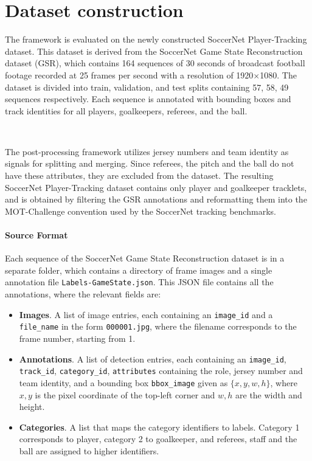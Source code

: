 \section{Dataset construction}\label{dataset_construction}
The framework is evaluated on the newly constructed SoccerNet Player-Tracking dataset. This dataset is derived from the SoccerNet Game State Reconstruction dataset (GSR), which contains 164 sequences of 30 seconds of broadcast football footage recorded at 25 frames per second with a resolution of 1920$\times$1080. The dataset is divided into train, validation, and test splits containing 57, 58, 49 sequences respectively. Each sequence is annotated with bounding boxes and track identities for all players, goalkeepers, referees, and the ball. 

\

The post-processing framework utilizes jersey numbers and team identity as signals for splitting and merging. Since referees, the pitch and the ball do not have these attributes, they are excluded from the dataset. The resulting SoccerNet Player-Tracking dataset contains only player and goalkeeper tracklets, and is obtained by filtering the GSR annotations and reformatting them into the MOT-Challenge convention used by the SoccerNet tracking benchmarks.

\paragraph{Source Format}
Each sequence of the SoccerNet Game State Reconstruction dataset is in a separate folder, which contains a directory of frame images and a single annotation file \texttt{Labels-GameState.json}. This JSON file contains all the annotations, where the relevant fields are:
\begin{itemize}
    \item \textbf{Images}. A list  of image entries, each containing an \texttt{image\_id} and a \texttt{file\_name} in the form \texttt{000001.jpg}, where the filename corresponds to the frame number, starting from 1.

    \item \textbf{Annotations}. A list of detection entries, each containing an \texttt{image\_id}, \texttt{track\_id}, \texttt{category\_id}, \texttt{attributes} containing the role, jersey number and team identity, and a bounding box \texttt{bbox\_image} given as $\{x,y,w,h\}$, where $x,y$ is the pixel coordinate of the top-left corner and $w,h$ are the width and height.

    \item \textbf{Categories}. A list that maps the category identifiers to labels. Category 1 corresponds to player, category 2 to goalkeeper, and referees, staff and the ball are assigned to higher identifiers. 
\end{itemize}

